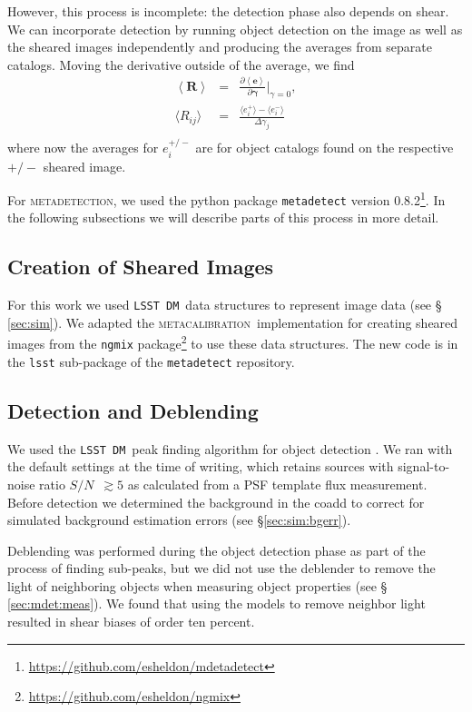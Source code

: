 \documentclass[twocolumn,twocolappendix,astrosym]{openjournal}
\newcommand{\snr}{$S/N$}
\newcommand{\dm}{\texttt{LSST DM}}
\newcommand{\mcal}{\textsc{metacalibration}}
\newcommand{\mdet}{\textsc{metadetection}}
\begin{document}
However, this process is incomplete:  the detection phase also depends on
shear.  We can incorporate detection by running object detection on the image
as well as the sheared images independently and producing the averages from
separate catalogs.  Moving the derivative outside of the average, we find
\begin{eqnarray} \label{eq:fullR}
    \left< \boldsymbol{R} \right> &=& \frac{\partial \left< \boldsymbol{e} \right> }{\partial \boldsymbol{\gamma} } \biggr\rvert_{\gamma=0},  \nonumber \\
    \langle R_{ij}\rangle &=& \frac{\langle e_i^{+}\rangle - \langle e_i^{-}\rangle}{\Delta\gamma_j} \nonumber \\
\end{eqnarray}
where now the averages for $e_i^{+/-}$ are for object catalogs found on the
respective ${+/-}$ sheared image.

For \mdet, we used the python package \texttt{metadetect} version
0.8.2\footnote{\url{https://github.com/esheldon/mdetadetect}}.  In the
following subsections we will describe parts of this process in more detail.

\subsection{Creation of Sheared Images} \label{sec:mdet:sheared}

For this work we used \dm\ data structures to represent image data (see \S
\ref{sec:sim}).  We adapted the \mcal\ implementation for creating sheared
images from the \texttt{ngmix}
package\footnote{\url{https://github.com/esheldon/ngmix}} to use these data
structures.  The new code is in the \texttt{lsst} sub-package of
the \texttt{metadetect} repository.


\subsection{Detection and Deblending} \label{sec:mdet:detect}

We used the \dm\ peak finding algorithm for object detection
\citep{BoschHSC2017}.  We ran with the default settings at the time of writing,
which retains sources with signal-to-noise ratio \snr\ $\gtrsim 5$ as calculated
from a PSF template flux measurement.  Before detection we determined the
background in the coadd to correct for simulated background estimation errors
(see \S \ref{sec:sim:bgerr}).

Deblending was performed during the object detection phase as part of the
process of finding sub-peaks, but we did not use the deblender to remove the
light of neighboring objects when measuring object properties (see \S
\ref{sec:mdet:meas}).  We found that using the models to remove neighbor light
resulted in shear biases of order ten percent.
\end{document}
